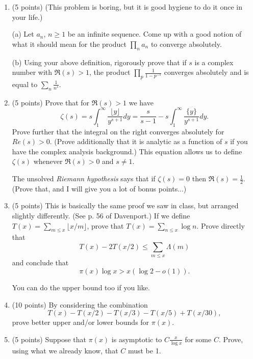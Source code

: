 \documentclass[12pt]{article}
\begin{document}
\begin{enumerate}
\item (5 points)
(This problem is boring, but it is good hygiene to do it once in your life.)

(a) Let $a_n$, $n \geq 1$ be an infinite sequence. Come up with a good notion of what it should mean
for the product $\prod_n a_n$ to converge absolutely.

(b) Using your above definition, rigorously prove that if $s$ is a complex number with $\Re(s) > 1$,
the product $\prod_p \frac{1}{1 - p^{-s}}$ converges absolutely and is equal to $\sum_n \frac{1}{n^s}$.

\item (5 points)
Prove that for $\Re(s) > 1$ we have
\begin{equation}
\zeta(s) = s \int_1^{\infty} \frac{ \lfloor y \rfloor }{y^{s + 1}} dy
= \frac{s}{s - 1} - s \int_1^{\infty} \frac{ \{ y \} }{y^{s + 1}} dy.
\end{equation}
Prove further that the integral on the right converges absolutely for $Re(s) > 0$. (Prove additionally that it
is analytic as a function of $s$ if you have the complex analysis background.) This equation allows us to
define $\zeta(s)$ whenever $\Re(s) > 0$ and $s \neq 1$.

The unsolved {\itshape Riemann hypothesis} says that if $\zeta(s) = 0$ then $\Re(s) = \frac{1}{2}$. (Prove that,
and I will give you a lot of bonus points...)

\item (5 points)
This is basically the same proof we saw in class, but arranged slightly differently. (See p. 56 of Davenport.)
If we define $T(x) = \sum_{m \leq x} \lfloor x/m \rfloor$, prove that $T(x) = \sum_{n \leq x} \log n$.
Prove directly that 
\begin{equation}
T(x) - 2T(x/2) \leq \sum_{m \leq x} \Lambda(m)
\end{equation}
and conclude that 
\begin{equation}
\pi(x) \log x > x (\log 2 - o(1)).
\end{equation}

You can do the upper bound too if you like.
\item (10 points)
By considering the combination
\begin{equation}
T(x) - T(x/2) - T(x/3) - T(x/5) + T(x/30),
\end{equation}
prove better upper and/or lower bounds for $\pi(x)$.

\item (5 points)
Suppose that $\pi(x)$ is asymptotic to $C \frac{x}{\log x}$ for some $C$. Prove, using what we already know,
that $C$ must be 1.


\end{enumerate}
\end{document}
